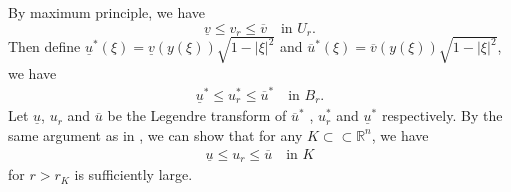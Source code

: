 \documentclass[reqno]{amsart}
\theoremstyle{remark}
\theoremstyle{definition}
\numberwithin{equation}{section}
\begin{document}
By maximum principle, we have 
\[
\underline{v} \leqslant v_r \leqslant \overline{v} \quad \text{in } U_r.
\]
Then define $\underline{u}^*(\xi) = \underline{v}(y(\xi)) \sqrt{1 - |\xi |^2}$ and $\overline{u}^*(\xi) = \overline{v}(y(\xi)) \sqrt{1 - |\xi |^2}$, we have
\begin{align*}
    \underline{u}^* \leqslant u_r^* \leqslant \overline{u}^* \quad \text{in } B_r.
\end{align*}
Let $\underline{u}$, $u_r$ and $\overline{u}$ be the Legendre transform of $\overline{u}^*$ , $u_r^*$ and $\underline{u}^*$ respectively. By the same argument as in \cite[section 6.1]{Entireconstantsigmak}, we can show that for any $K \subset \subset \mathbb{R}^n$, we have
\begin{align*}
    \underline{u} \leqslant u_r \leqslant \overline{u} \quad \text{in } K
\end{align*}
for $r>r_K$ is sufficiently large.


\end{document}
